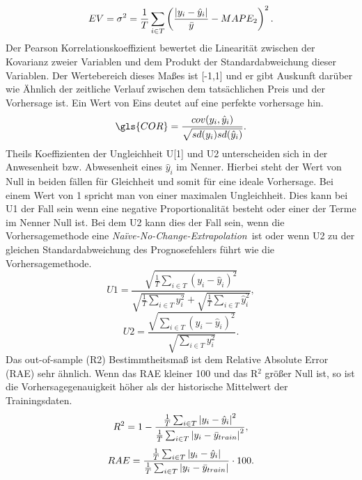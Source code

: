 \begin{equation}
EV= \sigma^2 = \frac{1}{T} \sum\limits_{i \in T} \left ( \frac{\abs{y_i-\hat{y}_i}}{\bar{y}} - MAPE_2  \right ) ^2.
\label{gl:EV}
\end{equation}
%
Der Pearson Korrelationskoeffizient bewertet die Linearität zwischen der Kovarianz zweier Variablen und dem Produkt der Standardabweichung dieser Variablen. Der Wertebereich dieses Maßes ist [-1,1] und er gibt Auskunft darüber wie Ähnlich der zeitliche Verlauf zwischen dem tatsächlichen Preis und der Vorhersage ist. Ein Wert von Eins deutet auf eine perfekte vorhersage hin.\, 
\begin{equation}
\gls{COR} = \frac{cov(y_i,\hat{y}_i)}{\sqrt{sd(y_i)sd(\hat{y}_i)}} .
\label{gl:cor}
\end{equation}
%
%
Theils Koeffizienten der Ungleichheit \gls{U}[1] und U2 unterscheiden sich in der Anwesenheit bzw. Abwesenheit eines $\hat{y}_i$ im Nenner. Hierbei steht der Wert von Null in beiden fällen für Gleichheit und somit für eine ideale Vorhersage. Bei einem Wert von 1 spricht man von einer maximalen Ungleichheit. Dies kann bei U1 der Fall sein wenn eine negative Proportionalität besteht oder einer der Terme im Nenner Null ist. Bei dem U2 kann dies der Fall sein, wenn die Vorhersagemethode eine \textit{Na\"{i}ve-No-Change-Extrapolation}\, ist oder wenn U2 zu der gleichen \hbox{Standardabweichung} des Prognosefehlers führt wie die Vorhersagemethode.\,
\begin{equation}
U1 = \frac{\sqrt{\frac{1}{T} \sum_{i \in T} (y_i-\hat{y}_i)^2}}{ \sqrt{\frac{1}{T} \sum_{i \in T} y_i^2} + \sqrt{\frac{1}{T} \sum_{i \in T} \hat{y}_i^2}},
\label{gl:U1}
\end{equation}
%
\begin{equation}
U2 = \frac{\sqrt{\sum_{i \in T} (y_i-\hat{y}_i)^2}}{ \sqrt{ \sum_{i \in T} y_i^2} }.
\label{gl:U2}
\end{equation}
%
%
Das out-of-sample (\gls{R2}) Bestimmtheitsmaß ist dem Relative Absolute Error (\gls{RAE}) sehr ähnlich. Wenn das RAE kleiner 100 und das R$^2$ größer Null ist, so ist die Vorhersagegenauigkeit höher als der historische Mittelwert der Trainingsdaten.
\begin{equation}
R^2 = 1 -  \frac{\frac{1}{T} \sum_{i \in T} \abs{y_i-\hat{y}_i}^2}{ \frac{1}{T} \sum_{i \in T} \abs{y_i-\bar{y}_{train}}^2 } ,
\label{gl:R2}
\end{equation}
%
%
\begin{equation}
RAE = \frac{\frac{1}{T} \sum_{i \in T} \abs{y_i-\hat{y}_i}}{ \frac{1}{T} \sum_{i \in T} \abs{y_i-\bar{y}_{train}} } \cdot 100 .
\label{gl:RAE}
\end{equation}
